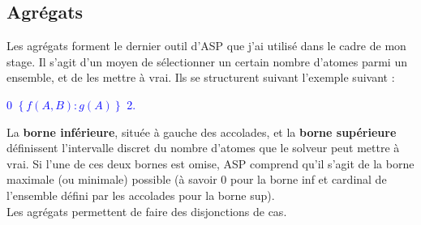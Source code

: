\documentclass[12pt,a4paper]{article}
\begin{document}
\subsection{Agrégats}
Les agrégats forment le dernier outil d'ASP que j'ai utilisé dans le cadre de mon stage. Il s'agit d'un moyen de sélectionner un certain nombre d'atomes parmi un ensemble, et de les mettre à vrai. Ils se 
structurent suivant l'exemple suivant :
\begin{center}
\textcolor{blue}{
  0 $\left\{ f(A,B):g(A)\right\}$ 2.
}
\end{center}
La \textbf{borne inférieure}, située à gauche des accolades, et la \textbf{borne supérieure} définissent l'intervalle discret du nombre d'atomes que le solveur peut mettre à vrai. Si l'une de ces deux bornes est omise, 
ASP comprend qu'il s'agit de la borne maximale (ou minimale) possible (à savoir 0 pour la borne inf et cardinal de l'ensemble défini par les accolades pour la borne sup).\\
Les agrégats permettent de faire des disjonctions de cas.
\end{document}
